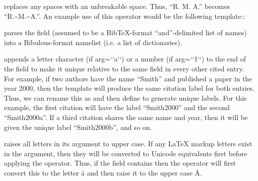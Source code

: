 \documentclass[letterpaper,10pt,english]{sphinxmanual}
\begin{document}
 replaces any spaces with an unbreakable space. Thus, “R. M. A.” becomes “R.\textasciitilde{}M.\textasciitilde{}A.”. An example use of this operator would be the following template::

%
\begin{sphinxVerbatim}[commandchars=\\\{\}]
  \PYG{p}{[}\PYG{p}{]}\PYG{p}{[} \PYG{p}{]}
             \PYG{p}{[}\PYG{p}{]}\PYG{p}{[} \PYG{p}{]}
\end{sphinxVerbatim}

 parses the field (assumed to be a BibTeX-format “and”-delimited list of names) into a Bibulous-format namelist (i.e. a list of dictionaries).

 appends a letter character (if arg={}`{}`a{}`{}`) or a number (if arg={}`{}`1{}`{}`) to the end of the field to make it unique relative to the same field in every other cited entry. For example, if two authors have the name “Smith” and published a paper in the year 2000, then the template  will produce the same citation label for both entries. Thus, we can rename this as  and then define  to generate unique labels. For this example, the first citation will have the label “Smith2000” and the second “Smith2000a”. If a third citation shares the same name and year, then it will be given the unique label “Smith2000b”, and so on.

 raises all letters in its argument to upper case. If any LaTeX markup letters exist in the argument, then they will be converted to Unicode equivalents first before applying the operator. Thus, if the field  contains  then the operator will first convert this to the letter å and then raise it to the upper case Å.
\end{document}

